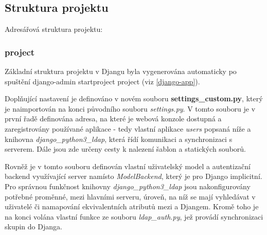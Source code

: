 \subsection{Struktura projektu}
Adresářová struktura projektu:

\subsubsection{project}
Základní struktura projektu v Djangu byla vygenerována automaticky po spuštění \textsf{django-admin startproject project} (viz \ref{django-app}).

Doplňující nastavení je definováno v novém souboru \textbf{settings\_custom.py}, který je naimportován na konci původního souboru \textit{settings.py}. V tomto souboru je v první řadě definována  adresa, na které je webová konzole dostupná a zaregistrovány používané aplikace - tedy vlastní aplikace \textit{users} popsaná níže a knihovna \textit{django\_python3\_ldap}, která řídí komunikaci a synchronizaci s  serverem. Dále jsou zde určeny cesty k nalezení šablon a statických souborů.

Rovněž je v tomto souboru definován vlastní uživatelský model a autentizační backend využívající  server namísto \textit{ModelBackend}, který je pro Django implicitní. Pro správnou funkčnost knihovny \textit{django\_python3\_ldap} jsou nakonfigurovány potřebné proměnné, mezi hlavními   serveru, úroveň, na níž se mají vyhledávat v  uživatelé či namapování ekvivalentních atributů mezi  a Djangem. Kromě toho je na konci volána vlastní funkce ze souboru \textit{ldap\_auth.py}, jež provádí synchronizaci skupin do Djanga.

